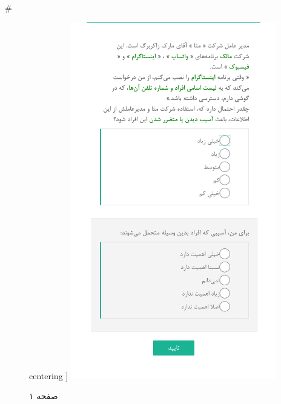 { 
 # 
\begin{figure}[htpb]
centering ]
\includegraphics[width=0.8\textwidth]{./img/Task50.png/}
\caption{صفحه ۱}
\label{fig:Task1}
\end{figure}
 
}
